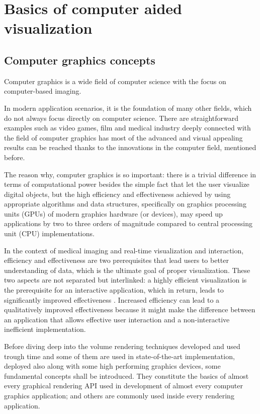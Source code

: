 \documentclass[12pt,a4paper]{extarticle}
\newcommand{\linespace}{\vspace{0pt}}
\begin{document}
\section{Basics of computer aided visualization}
\subsection{Computer graphics concepts} 
Computer graphics is a wide field of computer science with the focus on computer-based imaging.

In modern application scenarios, it is the foundation of many other fields, which do not always focus directly on computer science. There are straightforward examples such as video games, film and medical industry deeply connected with the field of computer graphics has most of the advanced and visual appealing results can be reached thanks to the innovations in the computer field, mentioned before.

The reason why, computer graphics is so important: there is a trivial difference in terms of computational power besides the simple fact that let the user visualize digital objects, but the high efficiency and effectiveness achieved by using appropriate algorithms and data structures, specifically on graphics processing units (GPUs) of modern graphics hardware (or devices), may speed up applications by two to three orders of magnitude compared to central processing unit (CPU) implementations.
\linespace

In the context of medical imaging and real-time visualization and interaction, efficiency and effectiveness are two prerequisites that lead users to better understanding of data, which is the ultimate goal of proper visualization.
These two aspects are not separated but interlinked: a highly efficient visualization is the prerequisite for an interactive application, which in return, leads to significantly improved effectiveness \cite{weiskopf_2006:1}.
Increased efficiency can lead to a qualitatively improved effectiveness because it might make the difference between an application that allows effective user interaction and a non-interactive inefficient implementation.
\linespace

Before diving deep into the volume rendering techniques developed and used trough time and some of them are  used in state-of-the-art implementation, deployed also along with some high performing graphics devices, some fundamental concepts shall be introduced. They constitute the basics of almost every graphical rendering API used in development of almost every computer graphics application; and others are commonly used inside every rendering application.
\end{document}
